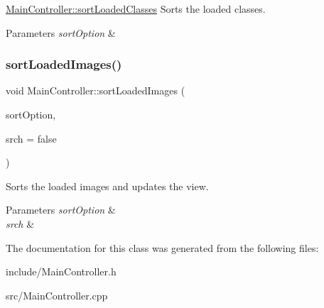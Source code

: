 \hyperlink{classMainController_a21e18cb936861042e1603c029f3c006e}{Main\+Controller\+::sort\+Loaded\+Classes} Sorts the loaded classes. 


\begin{DoxyParams}{Parameters}
{\em sort\+Option} & \\
\hline
\end{DoxyParams}
\mbox{\label{classMainController_ad131b9aae76e43061554feed80bb13a2}} 
\subsubsection{\texorpdfstring{sort\+Loaded\+Images()}{sortLoadedImages()}}
{\footnotesize\ttfamily void Main\+Controller\+::sort\+Loaded\+Images (\begin{DoxyParamCaption}\item[{const Q\+String \&}]{sort\+Option,  }\item[{bool}]{srch = {\ttfamily false} }\end{DoxyParamCaption})}



Sorts the loaded images and updates the view. 


\begin{DoxyParams}{Parameters}
{\em sort\+Option} & \\
\hline
{\em srch} & \\
\hline
\end{DoxyParams}


The documentation for this class was generated from the following files\+:\begin{DoxyCompactItemize}
\item 
include/Main\+Controller.\+h\item 
src/Main\+Controller.\+cpp\end{DoxyCompactItemize}
